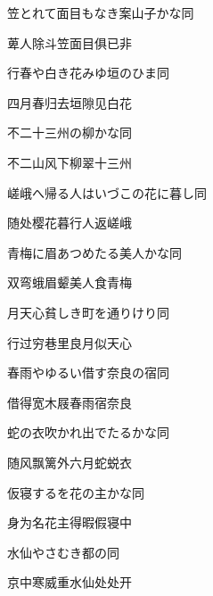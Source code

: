 \begin{haiku}
    {\FH 笠とれて面目もなき案山子かな}\hfill{\FH 同}

    {\FK 萆人除斗笠面目俱已非}
\end{haiku}

\begin{haiku}
    {\FH 行春や白き花みゆ垣のひま}\hfill{\FH 同}

    {\FK 四月春归去垣隙见白花}
\end{haiku}

\begin{haiku}
    {\FH 不二十三州の柳かな}\hfill{\FH 同}

    {\FK 不二山风下柳翠十三州}
\end{haiku}

\begin{haiku}
    {\FH 嵯峨へ帰る人はいづこの花に暮し}\hfill{\FH 同}

    {\FK 随处樱花暮行人返嵯峨}
\end{haiku}

\begin{haiku}
    {\FH 青梅に眉あつめたる美人かな}\hfill{\FH 同}

    {\FK 双弯蛾眉颦美人食青梅}
\end{haiku}

\begin{haiku}
    {\FH 月天心貧しき町を通りけり}\hfill{\FH 同}

    {\FK 行过穷巷里良月似天心}
\end{haiku}

\begin{haiku}
    {\FH 春雨やゆるい借す奈良の宿}\hfill{\FH 同}

    {\FK 借得宽木屐春雨宿奈良}
\end{haiku}

\begin{haiku}
    {\FH 蛇の衣吹かれ出でたるかな}\hfill{\FH 同}

    {\FK 随风飘篱外六月蛇蜕衣}
\end{haiku}

\begin{haiku}
    {\FH 仮寝するを花の主かな}\hfill{\FH 同}

    {\FK 身为名花主得暇假寝中}
\end{haiku}

\begin{haiku}
    {\FH 水仙やさむき都の}\hfill{\FH 同}

    {\FK 京中寒威重水仙处处开}
\end{haiku}

